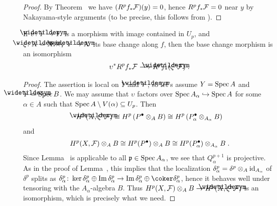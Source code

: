 \documentclass[a4paper,parskip=half,numbers=enddot, DIV=12]{scrreprt}
\begin{document}
\begin{proof}
	By Theorem~ we have $(R^pf_*\mathcal{F})(y)=0$, hence $R^pf_*\mathcal{F}=0$ near $y$ by Nakayama-style arguments (to be precise, this follows from \cite[Corollary~1.5.1]{alg2}).
\end{proof}
\begin{cor}
	If $\upsilon\colon \snake{Y}\morphism Y$ is a morphism with image contained in $U_p$, and $\xi\colon \snake{X}=X\times_Y\snake{Y}\morphism X$ its base change along $f$, then the base change morphism is an isomorphism
	\begin{align*}
		\upsilon^*R^pf_*\Ff\isomorphism R^p\snake{f}_*(\xi^*\Ff)\;.
	\end{align*}
\end{cor}
\begin{proof}
	The assertion is local on $Y$ and $\snake{Y}$, so let's assume $Y=\operatorname{Spec} A$ and $\snake{Y}=\Spec B$. We may assume that $\upsilon$ factors over $\Spec A_\alpha\monomorphism \Spec A$ for some $\alpha\in A$ such that $\operatorname{Spec} A\setminus V(\alpha)\subseteq U_p$. Then
	\begin{align*}
		H^p(\snake{X},\xi^*\Ff)\cong H^p\left(P^\bullet\otimes_AB\right)\cong H^p\left(P_\alpha^\bullet\otimes_{A_\alpha}B\right)
	\end{align*}
	and
	\begin{align*}
		H^p(X,\mathcal{F})\otimes_AB\cong H^p(P^\bullet)\otimes_AB\cong H^p(P_\alpha^\bullet)\otimes_{A_\alpha}B\;.
	\end{align*}
	Since Lemma~ is applicable to all $\mathfrak{p}\in \operatorname{Spec} A_\alpha$, we see that $Q_\alpha^{p+1}$ is projective. As in the proof of Lemma~, this implies that the localization $\delta_\alpha^p=\delta^p\otimes_A\operatorname{id}_{A_\alpha}$ of $\delta^p$ splits as $\delta_\alpha^p\colon \ker\delta_\alpha^p\oplus \Im \delta_\alpha^p\morphism \Im\delta_\alpha^p\oplus\coker\delta_\alpha^p$, hence it behaves well under tensoring with the $A_\alpha$-algebra $B$. Thus $H^p(X,\Ff)\otimes_AB\morphism H^p(\snake{X},\xi^*\Ff)$ is an isomorphism, which is precisely what we need.
\end{proof}
\end{document}
